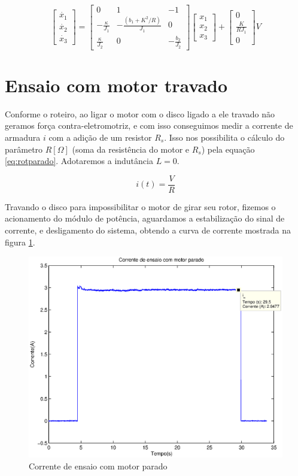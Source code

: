 \documentclass{article}
\begin{document}
\begin{equation}
\label{eq:ss}
\left[ \begin{array}{c}
\dot{x_1} \\
\dot{x_2} \\
\dot{x_3} \end{array} \right]
=
\left[ \begin{array}{ccc}
0 & 1 & -1 \\
-\frac{\kappa}{J_1} & -\frac{(b_1+K^2/R)}{J_1} & 0 \\
\frac{\kappa}{J_2} & 0 & -\frac{b_2}{J_2} \end{array} \right]
\left[ \begin{array}{c}
x_1 \\
x_2 \\
x_3  \end{array} \right]
+
\left[ \begin{array}{c}
0 				\\
\frac{K}{RJ_1} 	\\
0				\end{array} \right]
V
\end{equation}

\section{Ensaio com motor travado}
Conforme o roteiro\cite{bb:roteiro}, ao ligar o motor com o disco ligado a ele travado não geramos força contra-eletromotriz, e com isso conseguimos medir a corrente de armadura $i$ com a adição de um resistor $R_s$. Isso nos possibilita o cálculo do parâmetro $R [\Omega]$ (soma da resistência do motor e $R_s$) pela equação \ref{eq:rotparado}. Adotaremos a indutância $L=0$.

\begin{equation}
\label{eq:rotparado}
i(t) = \frac{V}{R}
\end{equation}

Travando o disco para impossibilitar o motor de girar seu rotor, fizemos o acionamento do módulo de potência, aguardamos a estabilização do sinal de corrente, e desligamento do sistema, obtendo a curva de corrente mostrada na figura \ref{fig:ensaiop}.

\begin{figure}[H]
	\centering
	\includegraphics[width=0.8\linewidth]{../ensaiop}
	\caption{Corrente de ensaio com motor parado}
	\label{fig:ensaiop}
\end{figure}
\end{document}

